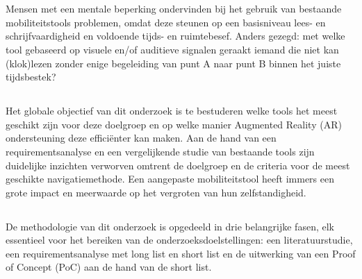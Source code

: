 
\chapter{}%
\label{ch:inleiding}

\section{}%
\label{sec:probleemstelling}

Mensen met een mentale beperking ondervinden bij het gebruik van bestaande mobiliteitstools
problemen, omdat deze steunen op een basisniveau lees- en schrijfvaardigheid en voldoende tijds- en ruimtebesef. Anders gezegd: met welke tool gebaseerd op visuele en/of auditieve signalen geraakt iemand die niet kan (klok)lezen zonder enige begeleiding van punt A naar punt B binnen het juiste tijdsbestek?


\section{}%
\label{sec:onderzoeksvraag}

Het globale objectief van dit onderzoek is te bestuderen welke tools het meest geschikt zijn voor deze doelgroep en op welke manier Augmented Reality (AR) ondersteuning deze efficiënter kan maken. Aan de hand van een requirementsanalyse en een vergelijkende studie van bestaande tools zijn duidelijke inzichten verworven omtrent de doelgroep en de criteria voor de meest geschikte navigatiemethode. Een aangepaste mobiliteitstool heeft immers een grote impact en meerwaarde op het vergroten van hun zelfstandigheid. 


\section{}%
\label{sec:onderzoeksdoelstelling}

De methodologie van dit onderzoek is opgedeeld in drie belangrijke fasen, elk essentieel voor het bereiken van de onderzoeksdoelstellingen: een literatuurstudie, een requirementsanalyse met long list en short list en de uitwerking van een Proof of Concept (PoC) aan de hand van de short list.

